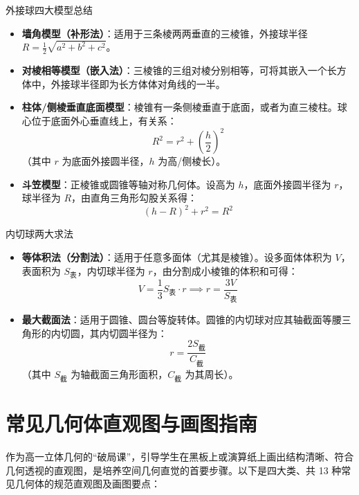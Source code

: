 \documentclass[11pt,a4paper]{ctexart}
\begin{document}
\begin{teachbox}{外接球四大模型总结}
\begin{itemize}
  \item \textbf{墙角模型（补形法）}：适用于三条棱两两垂直的三棱锥，外接球半径 $R = \frac{1}{2}\sqrt{a^2 + b^2 + c^2}$。
  \item \textbf{对棱相等模型（嵌入法）}：三棱锥的三组对棱分别相等，可将其嵌入一个长方体中，外接球半径即为长方体体对角线的一半。
  \item \textbf{柱体/侧棱垂直底面模型}：棱锥有一条侧棱垂直于底面，或者为直三棱柱。球心位于底面外心垂直线上，有关系：
    \[ R^2 = r^2 + \left(\frac{h}{2}\right)^2 \]
    （其中 $r$ 为底面外接圆半径，$h$ 为高/侧棱长）。
  \item \textbf{斗笠模型}：正棱锥或圆锥等轴对称几何体。设高为 $h$，底面外接圆半径为 $r$，球半径为 $R$，由直角三角形勾股关系得：
    \[ (h - R)^2 + r^2 = R^2 \]
\end{itemize}
\end{teachbox}

\begin{teachbox}{内切球两大求法}
\begin{itemize}
  \item \textbf{等体积法（分割法）}：适用于任意多面体（尤其是棱锥）。设多面体体积为 $V$，表面积为 $S_{\text{表}}$，内切球半径为 $r$，由分割成小棱锥的体积和可得：
    \[ V = \frac{1}{3} S_{\text{表}} \cdot r \implies r = \frac{3V}{S_{\text{表}}} \]
  \item \textbf{最大截面法}：适用于圆锥、圆台等旋转体。圆锥的内切球对应其轴截面等腰三角形的内切圆，其内切圆半径为：
    \[ r = \frac{2S_{\text{截}}}{C_{\text{截}}} \]
    （其中 $S_{\text{截}}$ 为轴截面三角形面积，$C_{\text{截}}$ 为其周长）。
\end{itemize}
\end{teachbox}


\newpage

\section{常见几何体直观图与画图指南}

作为高一立体几何的“破局课”，引导学生在黑板上或演算纸上画出结构清晰、符合几何透视的直观图，是培养空间几何直觉的首要步骤。以下是四大类、共 13 种常见几何体的规范直观图及画图要点：
\end{document}
